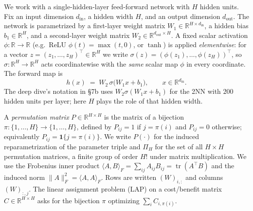\documentclass[11pt]{article}
\theoremstyle{definition}
\theoremstyle{remark}
\begin{document}
We work with a single-hidden-layer feed-forward network with $H$ hidden units. Fix an input
dimension $d_{\mathrm{in}}$, a hidden width $H$, and an output dimension $d_{\mathrm{out}}$. The
network is parametrized by a first-layer weight matrix $W_1\in\mathbb{R}^{H\times d_{\mathrm{in}}}$,
a hidden bias $b_1\in\mathbb{R}^{H}$, and a second-layer weight matrix
$W_2\in\mathbb{R}^{d_{\mathrm{out}}\times H}$. A fixed scalar activation
$\phi:\mathbb{R}\to\mathbb{R}$ (e.g.\ ReLU $\phi(t)=\max(t,0)$, or $\tanh$) is applied
\emph{elementwise}: for a vector $z=(z_1,\dots,z_H)^{\top}\in\mathbb{R}^{H}$ we write
$\sigma(z)=(\phi(z_1),\dots,\phi(z_H))^{\top}$, so $\sigma:\mathbb{R}^H\to\mathbb{R}^H$ acts
coordinatewise with the \emph{same} scalar map $\phi$ in every coordinate. The forward map is
\[
h(x)\;=\;W_2\,\sigma\!\bigl(W_1 x + b_1\bigr),\qquad x\in\mathbb{R}^{d_{\mathrm{in}}}.
\]
The deep dive's notation in \S7b uses $W_2\sigma(W_1x+b_1)$ for the 2NN with $200$ hidden units per
layer; here $H$ plays the role of that hidden width.

A \emph{permutation matrix} $P\in\mathbb{R}^{H\times H}$ is the matrix of a bijection
$\pi:\{1,\dots,H\}\to\{1,\dots,H\}$, defined by $P_{ij}=1$ if $j=\pi(i)$ and $P_{ij}=0$ otherwise;
equivalently $P_{ij}=\mathbf 1\{j=\pi(i)\}$. We write $P(\cdot)$ for the induced reparametrization of
the parameter triple and $\Pi_H$ for the set of all $H\times H$ permutation matrices, a finite group
of order $H!$ under matrix multiplication. We use the Frobenius inner product
$\langle A,B\rangle_F=\sum_{ij}A_{ij}B_{ij}=\operatorname{tr}(A^{\top}B)$ and the induced norm
$\lVert A\rVert_F^2=\langle A,A\rangle_F$. Rows are written $(W)_{i,:}$ and columns $(W)_{:,j}$. The
linear assignment problem (LAP) on a cost/benefit matrix $C\in\mathbb{R}^{H\times H}$ asks for the
bijection $\pi$ optimizing $\sum_i C_{i,\pi(i)}$.
\end{document}
